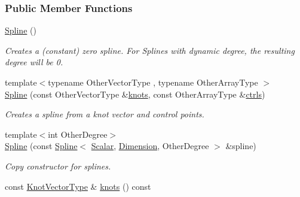 \subsubsection*{Public Member Functions}
\begin{DoxyCompactItemize}
\item 
\mbox{\label{group___splines___module_a25ebf3b3621db98ffe60eba3c0d64025}} 
\hyperlink{group___splines___module_a25ebf3b3621db98ffe60eba3c0d64025}{Spline} ()
\begin{DoxyCompactList}\small\item\em Creates a (constant) zero spline. For Splines with dynamic degree, the resulting degree will be 0. \end{DoxyCompactList}\item 
{\footnotesize template$<$typename Other\+Vector\+Type , typename Other\+Array\+Type $>$ }\\\hyperlink{group___splines___module_ac9dfdbeabf9573642d970e29e92dd2be}{Spline} (const Other\+Vector\+Type \&\hyperlink{group___splines___module_ae3eac8af580ad880d8ad3a259d453aa1}{knots}, const Other\+Array\+Type \&\hyperlink{group___splines___module_a0fc81e475d3a0ba34da1bd97f2e8fbc7}{ctrls})
\begin{DoxyCompactList}\small\item\em Creates a spline from a knot vector and control points. \end{DoxyCompactList}\item 
{\footnotesize template$<$int Other\+Degree$>$ }\\\hyperlink{group___splines___module_a0e6083605acc9f565e8bf4057b3f4bd3}{Spline} (const \hyperlink{group___splines___module_class_eigen_1_1_spline}{Spline}$<$ \hyperlink{group___splines___module_a8cafd78b564825c76fbb3419653d9742}{Scalar}, \hyperlink{group___splines___module_a82c233f1d4719bc52397d64a6c96c5b0a25366e5e79da5355d259a71096d8d8a7}{Dimension}, Other\+Degree $>$ \&spline)
\begin{DoxyCompactList}\small\item\em Copy constructor for splines. \end{DoxyCompactList}\item 
\mbox{\label{group___splines___module_ae3eac8af580ad880d8ad3a259d453aa1}} 
const \hyperlink{group___splines___module_a066f7a8b120316c9068b559f0790e9ec}{Knot\+Vector\+Type} \& \hyperlink{group___splines___module_ae3eac8af580ad880d8ad3a259d453aa1}{knots} () const

\end{DoxyCompactItemize}
